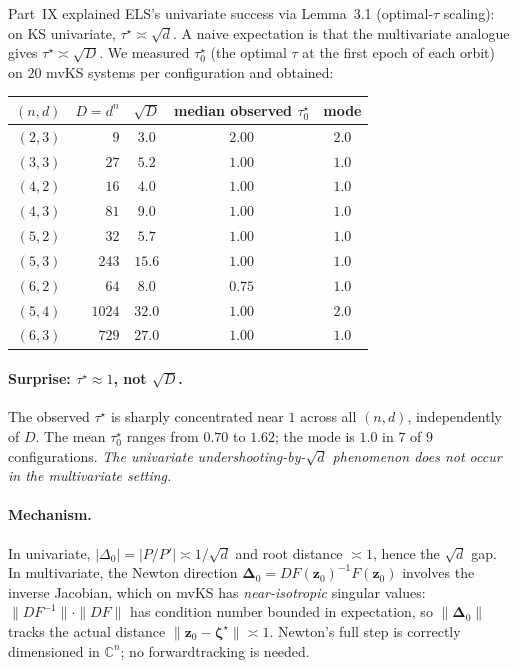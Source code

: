 \documentclass[11pt,a4paper]{article}
\begin{document}
Part~IX explained ELS's univariate success via Lemma~3.1 (optimal-$\tau$ scaling): on KS univariate, $\tau^\star \asymp \sqrt d$. A naive expectation is that the multivariate analogue gives $\tau^\star \asymp \sqrt D$. We measured $\tau^\star_0$ (the optimal $\tau$ at the first epoch of each orbit) on $20$ mvKS systems per configuration and obtained:

\begin{center}
\begin{tabular}{rrccc}
\toprule
$(n, d)$ & $D = d^n$ & $\sqrt D$ & median observed $\tau^\star_0$ & mode \\
\midrule
$(2, 3)$ & $9$    & $3.0$  & $2.00$ & $2.0$ \\
$(3, 3)$ & $27$   & $5.2$  & $1.00$ & $1.0$ \\
$(4, 2)$ & $16$   & $4.0$  & $1.00$ & $1.0$ \\
$(4, 3)$ & $81$   & $9.0$  & $1.00$ & $1.0$ \\
$(5, 2)$ & $32$   & $5.7$  & $1.00$ & $1.0$ \\
$(5, 3)$ & $243$  & $15.6$ & $1.00$ & $1.0$ \\
$(6, 2)$ & $64$   & $8.0$  & $0.75$ & $1.0$ \\
$(5, 4)$ & $1024$ & $32.0$ & $1.00$ & $2.0$ \\
$(6, 3)$ & $729$  & $27.0$ & $1.00$ & $1.0$ \\
\bottomrule
\end{tabular}
\end{center}

\paragraph{Surprise: $\tau^\star \approx 1$, not $\sqrt D$.}
The observed $\tau^\star$ is sharply concentrated near $1$ across all $(n, d)$, independently of $D$. The mean $\tau^\star_0$ ranges from $0.70$ to $1.62$; the mode is $1.0$ in $7$ of $9$ configurations. \emph{The univariate undershooting-by-$\sqrt d$ phenomenon does not occur in the multivariate setting.}

\paragraph{Mechanism.}
In univariate, $|\Delta_0| = |P/P'| \asymp 1/\sqrt d$ and root distance $\asymp 1$, hence the $\sqrt d$ gap. In multivariate, the Newton direction $\boldsymbol{\Delta}_0 = DF(\mathbf z_0)^{-1} F(\mathbf z_0)$ involves the inverse Jacobian, which on mvKS has \emph{near-isotropic} singular values: $\|DF^{-1}\| \cdot \|DF\|$ has condition number bounded in expectation, so $\|\boldsymbol{\Delta}_0\|$ tracks the actual distance $\|\mathbf z_0 - \boldsymbol\zeta^\star\| \asymp 1$. Newton's full step is correctly dimensioned in $\mathbb{C}^n$; no forwardtracking is needed.
\end{document}
